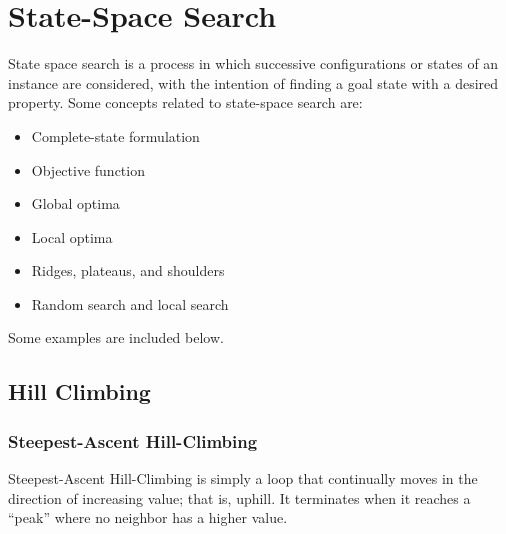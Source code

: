 %
%
%

\section{State-Space Search}
State space search is a process in which successive configurations or states of an instance are considered, with the intention of finding a goal state with a desired property. Some concepts related to state-space search are:

\begin{itemize}
    \item Complete-state formulation
    \item Objective function
    \item Global optima
    \item Local optima
    \item Ridges, plateaus, and shoulders
    \item Random search and local search
\end{itemize}

Some examples are included below.

\subsection{Hill Climbing}
\subsubsection{Steepest-Ascent Hill-Climbing}
Steepest-Ascent Hill-Climbing is simply a loop that continually moves in the direction of increasing value; that is, uphill. It terminates when it reaches a ``peak'' where no neighbor has a higher value.

\begin{algorithmic}[1]


        \State{}
        \Loop{}

            \EndIf{}

            \State{}
        \EndLoop{}

    \EndFunction{}
\end{algorithmic}

